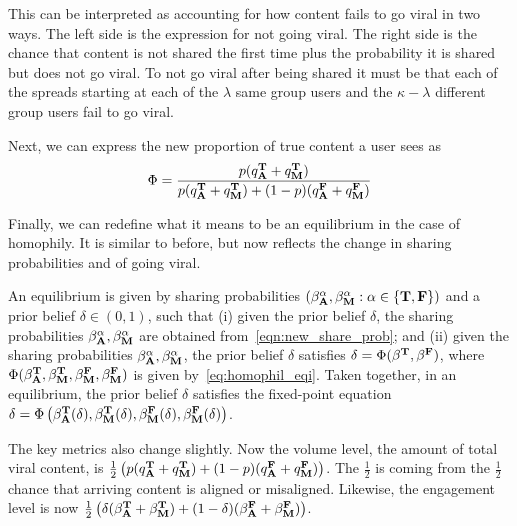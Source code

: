 This can be interpreted as accounting for how content fails to go viral in two ways. The left side is the expression for not going viral. The right side is the chance that content is not shared the first time plus the probability it is shared but does not go viral. To not go viral after being shared it must be that each of the spreads starting at each of the $\lambda$ same group users and the $\kappa - \lambda$ different group users fail to go viral. 

Next, we can express the new proportion of true content a user sees as
\begin{equation*}\label{eq:homophil_eqi}
    \Phi = \frac{p ( q_{\mathbf{A}}^{\mathbf{T}} + q_{\mathbf{M}}^{\mathbf{T}}) }{p ( q_{\mathbf{A}}^{\mathbf{T}} + q_{\mathbf{M}}^{\mathbf{T}}) + (1-p) ( q_{\mathbf{A}}^{\mathbf{F}} + q_{\mathbf{M}}^{\mathbf{F}})}
\end{equation*}

Finally, we can redefine what it means to be an equilibrium in the case of homophily. It is similar to before, but now reflects the change in sharing probabilities and of going viral. 

\begin{definition} An equilibrium is given by sharing probabilities $(\beta^\alpha_{\mathbf{A}}, \beta_{\mathbf{M}}^\alpha : \alpha \in \{\mathbf{T}, \mathbf{F}\})$ and a prior belief $\delta  \in (0,1)$, such that  (i) given the prior belief $\delta$, the sharing probabilities $\beta^\alpha_{\mathbf{A}}, \beta^\alpha_{\mathbf{M}}$ are obtained from~\eqref{eqn:new_share_prob}; and (ii) given the sharing probabilities $\beta_{\mathbf{A}}^\alpha, \beta_{\mathbf{M}}^\alpha$, the prior belief $\delta$ satisfies $\delta = \Phi(\beta^{\mathbf{T}}, \beta^{\mathbf{F}})$, where $\Phi(\beta_{\mathbf{A}}^{\mathbf{T}}, \beta_{\mathbf{M}}^{\mathbf{T}}, \beta_{\mathbf{M}}^{\mathbf{F}}, \beta_{\mathbf{M}}^{\mathbf{F}})$ is given by~\eqref{eq:homophil_eqi}. Taken together, in an equilibrium, the prior belief $\delta$ satisfies the fixed-point equation $\delta = \Phi\left(\beta_{\mathbf{A}}^{\mathbf{T}}(\delta), \beta_{\mathbf{M}}^{\mathbf{T}}(\delta), \beta_{\mathbf{M}}^{\mathbf{F}}(\delta), \beta_{\mathbf{M}}^{\mathbf{F}}(\delta)\right)$.
\end{definition}

The key metrics also change slightly. Now the volume level, the amount of total viral content, is $\frac{1}{2} \left( p (q_{\mathbf{A}}^{\mathbf{T}} + q_{\mathbf{M}}^{\mathbf{T}}) + (1-p)(q_{\mathbf{A}}^{\mathbf{F}} + q_{\mathbf{M}}^{\mathbf{F}}) \right) $. The $\frac{1}{2}$ is coming from the $\frac{1}{2}$ chance that arriving content is aligned or misaligned. Likewise, the engagement level is now $\frac{1}{2} \left( \delta (\beta^{\mathbf{T}}_{\mathbf{A}} + \beta^{\mathbf{T}}_{\mathbf{M}}) + (1-\delta) (\beta^{\mathbf{F}}_{\mathbf{A}} + \beta^{\mathbf{F}}_{\mathbf{M}}) \right)$. 

